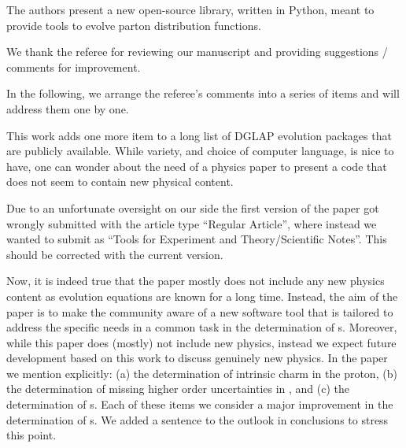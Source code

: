 \documentclass[a4paper,11pt]{article}
\newcounter{comment}[section]
\begin{document}
 

\begin{response}{
The authors present a new open-source library, written in Python, meant to
provide tools to evolve parton distribution functions.}

We thank the referee for reviewing our manuscript and providing suggestions / comments for improvement.

In the following, we arrange the referee's comments into a series of items and 
will address them one by one.

\end{response}



\begin{response}{
This work adds one more item to a long list of DGLAP evolution packages that are
publicly available. While variety, and choice of computer language, is nice to
have, one can wonder about the need of a physics paper to present a code that
does not seem to contain new physical content.}

Due to an unfortunate oversight on our side the first version of the paper got wrongly submitted with
the article type \enquote{Regular Article}, where instead we wanted to submit as
\enquote{Tools for Experiment and Theory/Scientific Notes}. This should be corrected with the current version.

Now, it is indeed true that the paper mostly does not include any new physics content as
\dglap{} evolution equations are known for a long time. Instead, the aim of the paper
is to make the community aware of a new software tool that is tailored to address the specific needs in a common
task in the determination of \pdf{}s. Moreover, while this paper does (mostly) not include
new physics, instead we expect future development based on this work to discuss
genuinely new physics. In the paper we mention explicitly: (a) the determination of
intrinsic charm in the proton, (b) the determination of missing higher order
uncertainties in \pdf{}, and (c) the determination of \nnnlo{} \pdf{}s. Each of these
items we consider a major improvement in the determination of \pdf{}s.
We added a sentence to the outlook in conclusions to stress this point.

\end{response}
\end{document}

